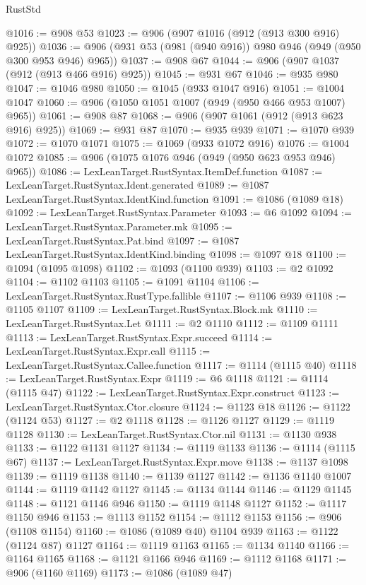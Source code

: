 \begin{lexlean}{RustStd}
\begin{coremodule}
@1016 := @908 @53
@1023 := @906 (@907 @1016 (@912 (@913 @300 @916) @925))
@1036 := @906 (@931 @53 (@981 (@940 @916)) @980 @946 (@949 (@950 @300 @953 @946) @965))
@1037 := @908 @67
@1044 := @906 (@907 @1037 (@912 (@913 @466 @916) @925))
@1045 := @931 @67
@1046 := @935 @980
@1047 := @1046 @980
@1050 := @1045 (@933 @1047 @916)
@1051 := @1004 @1047
@1060 := @906 (@1050 @1051 @1007 (@949 (@950 @466 @953 @1007) @965))
@1061 := @908 @87
@1068 := @906 (@907 @1061 (@912 (@913 @623 @916) @925))
@1069 := @931 @87
@1070 := @935 @939
@1071 := @1070 @939
@1072 := @1070 @1071
@1075 := @1069 (@933 @1072 @916)
@1076 := @1004 @1072
@1085 := @906 (@1075 @1076 @946 (@949 (@950 @623 @953 @946) @965))
@1086 := LexLeanTarget.RustSyntax.ItemDef.function
@1087 := LexLeanTarget.RustSyntax.Ident.generated
@1089 := @1087 LexLeanTarget.RustSyntax.IdentKind.function
@1091 := @1086 (@1089 @18)
@1092 := LexLeanTarget.RustSyntax.Parameter
@1093 := @6 @1092
@1094 := LexLeanTarget.RustSyntax.Parameter.mk
@1095 := LexLeanTarget.RustSyntax.Pat.bind
@1097 := @1087 LexLeanTarget.RustSyntax.IdentKind.binding
@1098 := @1097 @18
@1100 := @1094 (@1095 @1098)
@1102 := @1093 (@1100 @939)
@1103 := @2 @1092
@1104 := @1102 @1103
@1105 := @1091 @1104
@1106 := LexLeanTarget.RustSyntax.RustType.fallible
@1107 := @1106 @939
@1108 := @1105 @1107
@1109 := LexLeanTarget.RustSyntax.Block.mk
@1110 := LexLeanTarget.RustSyntax.Let
@1111 := @2 @1110
@1112 := @1109 @1111
@1113 := LexLeanTarget.RustSyntax.Expr.succeed
@1114 := LexLeanTarget.RustSyntax.Expr.call
@1115 := LexLeanTarget.RustSyntax.Callee.function
@1117 := @1114 (@1115 @40)
@1118 := LexLeanTarget.RustSyntax.Expr
@1119 := @6 @1118
@1121 := @1114 (@1115 @47)
@1122 := LexLeanTarget.RustSyntax.Expr.construct
@1123 := LexLeanTarget.RustSyntax.Ctor.closure
@1124 := @1123 @18
@1126 := @1122 (@1124 @53)
@1127 := @2 @1118
@1128 := @1126 @1127
@1129 := @1119 @1128
@1130 := LexLeanTarget.RustSyntax.Ctor.nil
@1131 := @1130 @938
@1133 := @1122 @1131 @1127
@1134 := @1119 @1133
@1136 := @1114 (@1115 @67)
@1137 := LexLeanTarget.RustSyntax.Expr.move
@1138 := @1137 @1098
@1139 := @1119 @1138
@1140 := @1139 @1127
@1142 := @1136 @1140 @1007
@1144 := @1119 @1142 @1127
@1145 := @1134 @1144
@1146 := @1129 @1145
@1148 := @1121 @1146 @946
@1150 := @1119 @1148 @1127
@1152 := @1117 @1150 @946
@1153 := @1113 @1152
@1154 := @1112 @1153
@1156 := @906 (@1108 @1154)
@1160 := @1086 (@1089 @40) @1104 @939
@1163 := @1122 (@1124 @87) @1127
@1164 := @1119 @1163
@1165 := @1134 @1140
@1166 := @1164 @1165
@1168 := @1121 @1166 @946
@1169 := @1112 @1168
@1171 := @906 (@1160 @1169)
@1173 := @1086 (@1089 @47)

\end{coremodule}
\end{lexlean}
